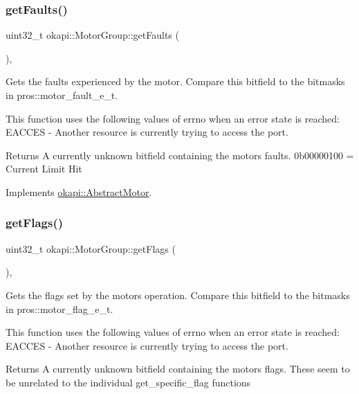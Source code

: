 \subsubsection{\texorpdfstring{getFaults()}{getFaults()}}
{\footnotesize\ttfamily uint32\+\_\+t okapi\+::\+Motor\+Group\+::get\+Faults (\begin{DoxyParamCaption}{ }\end{DoxyParamCaption})\hspace{0.3cm}{\ttfamily [override]}, {\ttfamily [virtual]}}

Gets the faults experienced by the motor. Compare this bitfield to the bitmasks in pros\+::motor\+\_\+fault\+\_\+e\+\_\+t.

This function uses the following values of errno when an error state is reached\+: E\+A\+C\+C\+ES -\/ Another resource is currently trying to access the port.

\begin{DoxyReturn}{Returns}
A currently unknown bitfield containing the motor\textquotesingle{}s faults. 0b00000100 = Current Limit Hit 
\end{DoxyReturn}


Implements \mbox{\hyperlink{classokapi_1_1AbstractMotor_ae741463ec8de88c4f7ba854b5d6d7bce}{okapi\+::\+Abstract\+Motor}}.

\mbox{\label{classokapi_1_1MotorGroup_a5a8206be671413586f461a45132c9056}} 
\subsubsection{\texorpdfstring{getFlags()}{getFlags()}}
{\footnotesize\ttfamily uint32\+\_\+t okapi\+::\+Motor\+Group\+::get\+Flags (\begin{DoxyParamCaption}{ }\end{DoxyParamCaption})\hspace{0.3cm}{\ttfamily [override]}, {\ttfamily [virtual]}}

Gets the flags set by the motor\textquotesingle{}s operation. Compare this bitfield to the bitmasks in pros\+::motor\+\_\+flag\+\_\+e\+\_\+t.

This function uses the following values of errno when an error state is reached\+: E\+A\+C\+C\+ES -\/ Another resource is currently trying to access the port.

\begin{DoxyReturn}{Returns}
A currently unknown bitfield containing the motor\textquotesingle{}s flags. These seem to be unrelated to the individual get\+\_\+specific\+\_\+flag functions 
\end{DoxyReturn}


